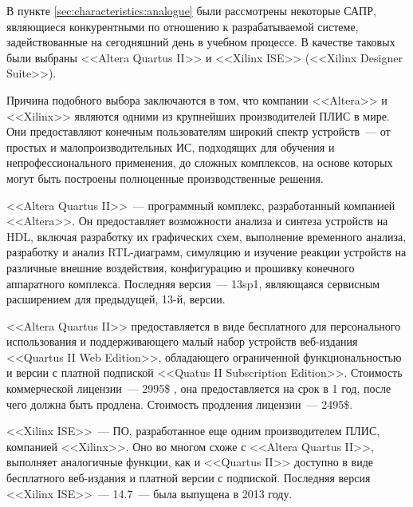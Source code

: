 В пункте \ref{sec:characteristics:analogue} были рассмотрены некоторые САПР, являющиеся конкурентными по отношению к разрабатываемой системе, задействованные на сегодняшний день в учебном процессе.
В качестве таковых были выбраны <<Altera Quartus II>> и <<Xilinx ISE>> (<<Xilinx Designer Suite>>).

Причина подобного выбора заключаются в том, что компании <<Altera>> и <<Xilinx>> являются одними из крупнейших производителей ПЛИС в мире.
Они предоставляют конечным пользователям широкий спектр устройств~--- от простых и малопроизводительных ИС, подходящих для обучения и непрофессионального применения, до сложных комплексов, на основе которых могут быть построены полноценные производственные решения.

<<Altera Quartus II>>~--- программный комплекс, разработанный компанией <<Altera>>.
Он предоставляет возможности анализа и синтеза устройств на HDL, включая разработку их графических схем, выполнение временного анализа, разработку и анализ RTL-диаграмм, симуляцию и изучение реакции устройств на различные внешние воздействия, конфигурацию и прошивку конечного аппаратного комплекса.
Последняя версия~--- 13sp1, являющаяся сервисным расширением для предыдущей, 13-й, версии.

<<Altera Quartus II>> предоставляется в виде бесплатного для персонального использования и поддерживающего малый набор устройств веб-издания <<Quartus II Web Edition>>, обладающего ограниченной функциональностью и версии с платной подпиской <<Quatus II Subscription Edition>>.
Стоимость коммерческой лицензии~--- 2995\$ , она предоставляется на срок в 1 год, после чего должна быть продлена.
Стоимость продления лицензии~--- 2495\$.

<<Xilinx ISE>>~--- ПО, разработанное еще одним производителем ПЛИС, компанией <<Xilinx>>.
Оно во многом схоже с <<Altera Quartus II>>, выполняет аналогичные функции, как и <<Quartus II>> доступно в виде бесплатного веб-издания и платной версии с подпиской.
Последняя версия <<Xilinx ISE>>~--- 14.7~--- была выпущена в 2013 году.

